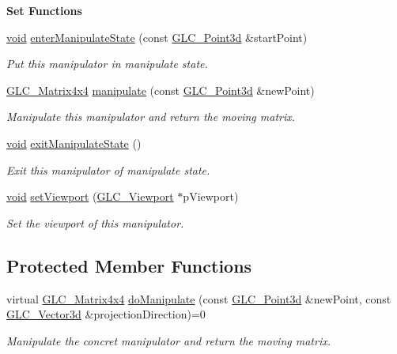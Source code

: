 \begin{Indent}{\bf Set Functions}\par
\begin{DoxyCompactItemize}
\item 
\hyperlink{group___u_a_v_objects_plugin_ga444cf2ff3f0ecbe028adce838d373f5c}{void} \hyperlink{class_g_l_c___abstract_manipulator_a13e2c25334e82347c1fd8992f9730665}{enter\-Manipulate\-State} (const \hyperlink{glc__vector3d_8h_a4e13a9bbc7ab3d34de7e98b41836772c}{G\-L\-C\-\_\-\-Point3d} \&start\-Point)
\begin{DoxyCompactList}\small\item\em Put this manipulator in manipulate state. \end{DoxyCompactList}\item 
\hyperlink{class_g_l_c___matrix4x4}{G\-L\-C\-\_\-\-Matrix4x4} \hyperlink{class_g_l_c___abstract_manipulator_a37d31c4c382726e0b30ce64e5580215a}{manipulate} (const \hyperlink{glc__vector3d_8h_a4e13a9bbc7ab3d34de7e98b41836772c}{G\-L\-C\-\_\-\-Point3d} \&new\-Point)
\begin{DoxyCompactList}\small\item\em Manipulate this manipulator and return the moving matrix. \end{DoxyCompactList}\item 
\hyperlink{group___u_a_v_objects_plugin_ga444cf2ff3f0ecbe028adce838d373f5c}{void} \hyperlink{class_g_l_c___abstract_manipulator_a1f545e3fe9e7b74f1fcf495ffd00579c}{exit\-Manipulate\-State} ()
\begin{DoxyCompactList}\small\item\em Exit this manipulator of manipulate state. \end{DoxyCompactList}\item 
\hyperlink{group___u_a_v_objects_plugin_ga444cf2ff3f0ecbe028adce838d373f5c}{void} \hyperlink{class_g_l_c___abstract_manipulator_af033a788ef680a1a06dd62f04d8f6baa}{set\-Viewport} (\hyperlink{class_g_l_c___viewport}{G\-L\-C\-\_\-\-Viewport} $\ast$p\-Viewport)
\begin{DoxyCompactList}\small\item\em Set the viewport of this manipulator. \end{DoxyCompactList}\end{DoxyCompactItemize}
\end{Indent}
\subsection*{Protected Member Functions}
\begin{DoxyCompactItemize}
\item 
virtual \hyperlink{class_g_l_c___matrix4x4}{G\-L\-C\-\_\-\-Matrix4x4} \hyperlink{class_g_l_c___abstract_manipulator_a75d2c9e9ba5e21dad1d238e95ee85eb5}{do\-Manipulate} (const \hyperlink{glc__vector3d_8h_a4e13a9bbc7ab3d34de7e98b41836772c}{G\-L\-C\-\_\-\-Point3d} \&new\-Point, const \hyperlink{class_g_l_c___vector3d}{G\-L\-C\-\_\-\-Vector3d} \&projection\-Direction)=0
\begin{DoxyCompactList}\small\item\em Manipulate the concret manipulator and return the moving matrix. \end{DoxyCompactList}\end{DoxyCompactItemize}
